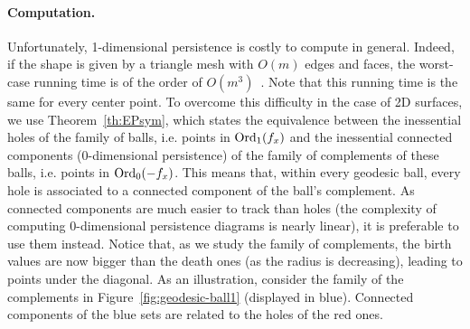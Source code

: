 \paragraph*{Computation.}
Unfortunately, 1-dimensional persistence is costly to compute in general. %
Indeed, if the shape is given by a triangle mesh with $O(m)$ edges and faces, the worst-case running time is
of the order of $O(m^3)$~\cite{Morozov08}. Note that this running time is the same for every
center point.
To overcome this difficulty in the case of 2D surfaces, we use Theorem~\ref{th:EPsym},
which states
the equivalence between the inessential holes of the family of balls, i.e. points in $\mathrm{Ord}_1(f_x)$ and the inessential connected
components (0-dimensional persistence) of the family of complements of these balls, i.e. points in $\mathrm{Ord}_0(-f_x)$. This means that, within
every geodesic ball, every hole is associated to a connected component of the ball's complement. As
connected components are much easier to track than holes (the complexity of computing 0-dimensional persistence
diagrams is nearly linear), it is preferable to use them instead. Notice that, as we study the
family of complements, the birth values are now bigger than the death ones (as the radius is
decreasing), leading to points under the diagonal. As an illustration,
consider the family of the complements in Figure~\ref{fig:geodesic-ball1} (displayed in blue).
Connected components of the blue sets are related to the holes of the red ones.
